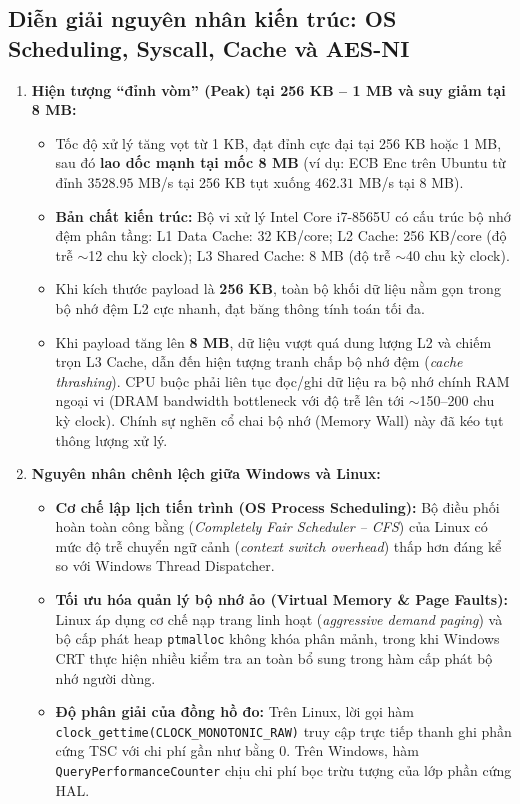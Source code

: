 \documentclass[12pt, a4paper]{report}
\begin{document}
\subsection{Diễn giải nguyên nhân kiến trúc: OS Scheduling, Syscall, Cache và AES-NI}
\begin{enumerate}
    \item \textbf{Hiện tượng ``đỉnh vòm'' (Peak) tại 256 KB -- 1 MB và suy giảm tại 8 MB:}
    \begin{itemize}
        \item Tốc độ xử lý tăng vọt từ 1 KB, đạt đỉnh cực đại tại 256 KB hoặc 1 MB, sau đó \textbf{lao dốc mạnh tại mốc 8 MB} (ví dụ: ECB Enc trên Ubuntu từ đỉnh $3528.95$ MB/s tại 256 KB tụt xuống $462.31$ MB/s tại 8 MB).
        \item \textbf{Bản chất kiến trúc:} Bộ vi xử lý Intel Core i7-8565U có cấu trúc bộ nhớ đệm phân tầng: L1 Data Cache: 32 KB/core; L2 Cache: 256 KB/core (độ trễ $\sim$12 chu kỳ clock); L3 Shared Cache: 8 MB (độ trễ $\sim$40 chu kỳ clock).
        \item Khi kích thước payload là \textbf{256 KB}, toàn bộ khối dữ liệu nằm gọn trong bộ nhớ đệm L2 cực nhanh, đạt băng thông tính toán tối đa.
        \item Khi payload tăng lên \textbf{8 MB}, dữ liệu vượt quá dung lượng L2 và chiếm trọn L3 Cache, dẫn đến hiện tượng tranh chấp bộ nhớ đệm (\textit{cache thrashing}). CPU buộc phải liên tục đọc/ghi dữ liệu ra bộ nhớ chính RAM ngoại vi (DRAM bandwidth bottleneck với độ trễ lên tới $\sim$150--200 chu kỳ clock). Chính sự nghẽn cổ chai bộ nhớ (Memory Wall) này đã kéo tụt thông lượng xử lý.
    \end{itemize}
    \item \textbf{Nguyên nhân chênh lệch giữa Windows và Linux:}
    \begin{itemize}
        \item \textbf{Cơ chế lập lịch tiến trình (OS Process Scheduling):} Bộ điều phối hoàn toàn công bằng (\textit{Completely Fair Scheduler -- CFS}) của Linux có mức độ trễ chuyển ngữ cảnh (\textit{context switch overhead}) thấp hơn đáng kể so với Windows Thread Dispatcher.
        \item \textbf{Tối ưu hóa quản lý bộ nhớ ảo (Virtual Memory \& Page Faults):} Linux áp dụng cơ chế nạp trang linh hoạt (\textit{aggressive demand paging}) và bộ cấp phát heap \texttt{ptmalloc} không khóa phân mảnh, trong khi Windows CRT thực hiện nhiều kiểm tra an toàn bổ sung trong hàm cấp phát bộ nhớ người dùng.
        \item \textbf{Độ phân giải của đồng hồ đo:} Trên Linux, lời gọi hàm \texttt{clock\_gettime(CLOCK\_MONOTONIC\_RAW)} truy cập trực tiếp thanh ghi phần cứng TSC với chi phí gần như bằng 0. Trên Windows, hàm \texttt{QueryPerformanceCounter} chịu chi phí bọc trừu tượng của lớp phần cứng HAL.

\end{itemize}
\end{enumerate}
\end{document}
